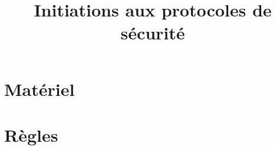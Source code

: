 \documentclass[a4paper,10pt]{article}
\title{Initiations aux protocoles de sécurité}
\begin{document}
\maketitle

\section{Matériel}

\section{Règles}
\end{document}
